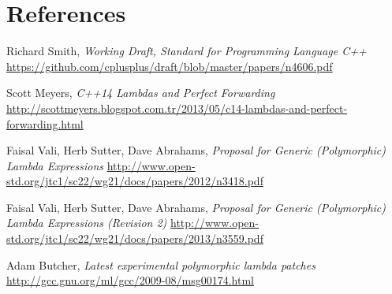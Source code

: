 \documentclass[11pt]{article}
\begin{document}
\section{References}
\renewcommand{\section}[2]{}%
\begin{thebibliography}{9}

    Richard Smith,
    \emph{Working Draft, Standard for Programming Language C++}\newline
    \url{https://github.com/cplusplus/draft/blob/master/papers/n4606.pdf}

    Scott Meyers,
    \emph{C++14 Lambdas and Perfect Forwarding}\newline
    \url{http://scottmeyers.blogspot.com.tr/2013/05/c14-lambdas-and-perfect-forwarding.html}

    Faisal Vali, Herb Sutter, Dave Abrahams,
    \emph{Proposal for Generic (Polymorphic) Lambda Expressions}\newline
    \url{http://www.open-std.org/jtc1/sc22/wg21/docs/papers/2012/n3418.pdf}

    Faisal Vali, Herb Sutter, Dave Abrahams,
    \emph{Proposal for Generic (Polymorphic) Lambda Expressions (Revision 2)}\newline
    \url{http://www.open-std.org/jtc1/sc22/wg21/docs/papers/2013/n3559.pdf}

    Adam Butcher,
    \emph{Latest experimental polymorphic lambda patches}\newline
    \url{http://gcc.gnu.org/ml/gcc/2009-08/msg00174.html}

\end{thebibliography}
\end{document}

